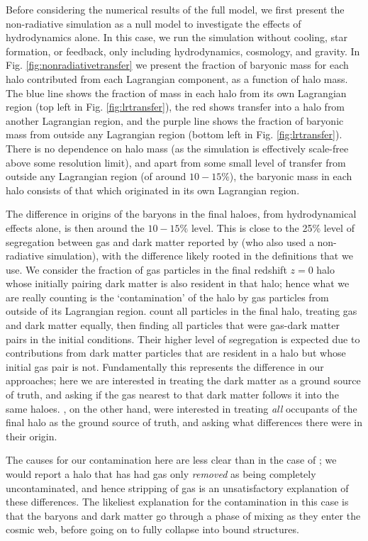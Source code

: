 Before considering the numerical results of the full model, we first present
the non-radiative simulation as a null model to investigate the effects of
hydrodynamics alone. In this case, we run the simulation without cooling,
star formation, or feedback, only including hydrodynamics, cosmology, and
gravity. In Fig. \ref{fig:nonradiativetransfer} we present the fraction of
baryonic mass for each halo contributed from each Lagrangian component, as a
function of halo mass. The blue line shows the fraction of mass in each halo
from its own Lagrangian region (top left in Fig. \ref{fig:lrtransfer}), the
red shows transfer into a halo from another Lagrangian region, and the purple
line shows the fraction of baryonic mass from outside any Lagrangian region
(bottom left in Fig. \ref{fig:lrtransfer}). There is no dependence on halo
mass (as the simulation is effectively scale-free above some resolution
limit), and apart from some small level of transfer from outside any
Lagrangian region (of around $10-15\%$), the baryonic mass in each halo
consists of that which originated in its own Lagrangian region.

The difference in origins of the baryons in the final haloes, from
hydrodynamical effects alone, is then around the $10-15\%$ level. This is
close to the 25\% level of segregation between gas and dark matter reported
by \citet{Liao2017} (who also used a non-radiative simulation), with the
difference likely rooted in the definitions that we use. We consider the
fraction of gas particles in the final redshift $z=0$ halo whose initially
pairing dark matter is also resident in that halo; hence what we are really
counting is the `contamination' of the halo by gas particles from outside of
its Lagrangian region. \citet{Liao2017} count all particles in the final
halo, treating gas and dark matter equally, then finding all particles that
were gas-dark matter pairs in the initial conditions. Their higher level of
segregation is expected due to contributions from dark matter particles that
are resident in a halo but whose initial gas pair is not. Fundamentally this
represents the difference in our approaches; here we are interested in
treating the dark matter as a ground source of truth, and asking if the gas
nearest to that dark matter follows it into the same haloes.
\citet{Liao2017}, on the other hand, were interested in treating \emph{all}
occupants of the final halo as the ground source of truth, and asking what
differences there were in their origin.

The causes for our contamination here are less clear than in the case of
\citet{Liao2017}; we would report a halo that has had gas only \emph{removed}
as being completely uncontaminated, and hence stripping of gas is
an unsatisfactory explanation of these differences. The likeliest explanation
for the contamination in this case is that the baryons and dark matter go through
a phase of mixing as they enter the cosmic web, before going on to fully
collapse into bound structures.


